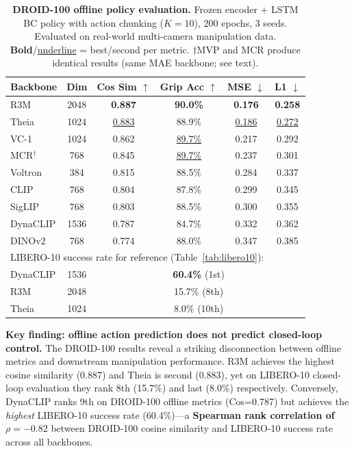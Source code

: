 \documentclass{article}
\newcommand{\methodname}{DynaCLIP}
\newcommand{\best}[1]{\textbf{#1}}
\newcommand{\second}[1]{\underline{#1}}
\begin{document}
\begin{table}[t]
\centering
\caption{\textbf{DROID-100 offline policy evaluation.} Frozen encoder + LSTM BC policy with action chunking ($K{=}10$), 200 epochs, 3 seeds. Evaluated on real-world multi-camera manipulation data. \best{Bold}/\second{underline} = best/second per metric. $\dagger$MVP and MCR produce identical results (same MAE backbone; see text).}
\label{tab:droid100}
\small
\setlength{\tabcolsep}{4pt}
\begin{tabular}{@{}lccccc@{}}
\toprule
\textbf{Backbone} & \textbf{Dim} & \textbf{Cos Sim $\uparrow$} & \textbf{Grip Acc $\uparrow$} & \textbf{MSE $\downarrow$} & \textbf{L1 $\downarrow$} \\
\midrule
R3M           & 2048 & \best{0.887}  & \best{90.0\%} & \best{0.176}  & \best{0.258}  \\
Theia         & 1024 & \second{0.883} & 88.9\%         & \second{0.186} & \second{0.272} \\
VC-1          & 1024 & 0.862          & \second{89.7\%} & 0.217          & 0.292          \\
MCR$^\dagger$ & 768  & 0.845          & \second{89.7\%} & 0.237          & 0.301          \\
Voltron       & 384  & 0.815          & 88.5\%         & 0.284          & 0.337          \\
CLIP          & 768  & 0.804          & 87.8\%         & 0.299          & 0.345          \\
SigLIP        & 768  & 0.803          & 88.5\%         & 0.300          & 0.355          \\
\methodname{} & 1536 & 0.787          & 84.7\%         & 0.332          & 0.362          \\
DINOv2        & 768  & 0.774          & 88.0\%         & 0.347          & 0.385          \\
\midrule
\multicolumn{6}{l}{\small LIBERO-10 success rate for reference (Table~\ref{tab:libero10}):} \\
\midrule
\methodname{} & 1536 & \multicolumn{4}{c}{\best{60.4\%} (1st)} \\
R3M           & 2048 & \multicolumn{4}{c}{15.7\% (8th)} \\
Theia         & 1024 & \multicolumn{4}{c}{8.0\% (10th)} \\
\bottomrule
\end{tabular}
\vspace{-0.5em}
\end{table}

\textbf{Key finding: offline action prediction does not predict closed-loop control.} The DROID-100 results reveal a striking disconnection between offline metrics and downstream manipulation performance. R3M achieves the highest cosine similarity (0.887) and Theia is second (0.883), yet on LIBERO-10 closed-loop evaluation they rank 8th (15.7\%) and last (8.0\%) respectively. Conversely, \methodname{} ranks 9th on DROID-100 offline metrics (Cos=0.787) but achieves the \emph{highest} LIBERO-10 success rate (60.4\%)---a \textbf{Spearman rank correlation of $\rho{=}-0.82$} between DROID-100 cosine similarity and LIBERO-10 success rate across all backbones.
\end{document}
